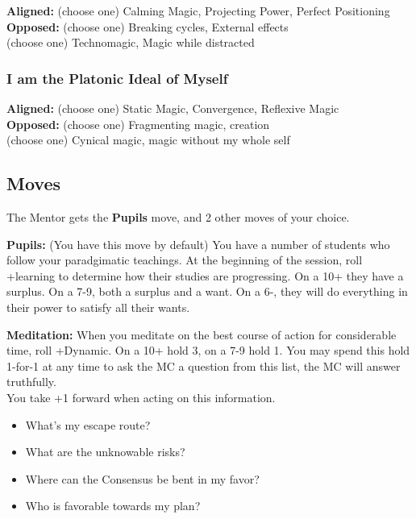 \documentclass[10pt,twoside,openright]{memoir}
\begin{document}
\textbf{Aligned:} (choose one) Calming Magic, Projecting Power, Perfect
Positioning\\
\textbf{Opposed:} (choose one) Breaking cycles, External effects\\
(choose one) Technomagic, Magic while distracted

\hypertarget{i-am-the-platonic-ideal-of-myself}{%
\subsubsection{I am the Platonic Ideal of
Myself}\label{i-am-the-platonic-ideal-of-myself}}

\textbf{Aligned:} (choose one) Static Magic, Convergence, Reflexive
Magic\\
\textbf{Opposed:} (choose one) Fragmenting magic, creation\\
(choose one) Cynical magic, magic without my whole self

\hypertarget{moves-1}{%
\subsection{Moves}\label{moves-1}}

The Mentor gets the \textbf{Pupils} move, and 2 other moves of your
choice.

\textbf{Pupils:} (You have this move by default) You have a number of
students who follow your paradgimatic teachings. At the beginning of the
session, roll +learning to determine how their studies are progressing.
On a 10+ they have a surplus. On a 7-9, both a surplus and a want. On a
6-, they will do everything in their power to satisfy all their wants.

\textbf{Meditation:} When you meditate on the best course of action for
considerable time, roll +Dynamic. On a 10+ hold 3, on a 7-9 hold 1. You
may spend this hold 1-for-1 at any time to ask the MC a question from
this list, the MC will answer truthfully.\\
You take +1 forward when acting on this information.

\begin{itemize}
\tightlist
\item
  What's my escape route?
\item
  What are the unknowable risks?
\item
  Where can the Consensus be bent in my favor?
\item
  Who is favorable towards my plan?
\end{itemize}
\end{document}
